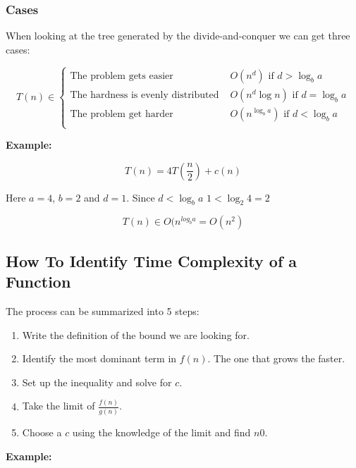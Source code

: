 \subsubsection{Cases}

When looking at the tree generated by the divide-and-conquer we can get three cases:

\[
    T(n) \in
    \begin{cases}
        \text{The problem gets easier } &O(n^d) \text{ if } d > \log_b a \\
        \text{The hardness is evenly distributed } &O(n^d \log n) \text{ if } d = \log_b a \\
        \text{The problem get harder } &O(n^{\log_{b}a}) \text{ if } d < \log_b a \\
    \end{cases}
\]

\textbf{Example:}

\[
    T(n) = 4T (\frac{n}{2}) + c(n)
\]

Here \(a = 4\), \(b = 2\) and \(d = 1\). Since \(d < \log_b a\) \(1 < \log_2 4 = 2\) 

\[
    T(n) \in O(n^{log_b a} = O(n^2)
\]    


\subsection{How To Identify Time Complexity of a Function}

The process can be summarized into 5 steps:

\begin{enumerate}
    
    \item Write the definition of the bound we are looking for.
    
    \item Identify the most dominant term in \(f(n)\). The one that grows the faster.
    
    \item Set up the inequality and solve for \(c\).
    
    \item Take the limit of \(\frac{f(n)}{g(n)}\).
    
    \item Choose a \(c\) using the knowledge of the limit and find \(n0\). 

\end{enumerate}

\textbf{Example:}

